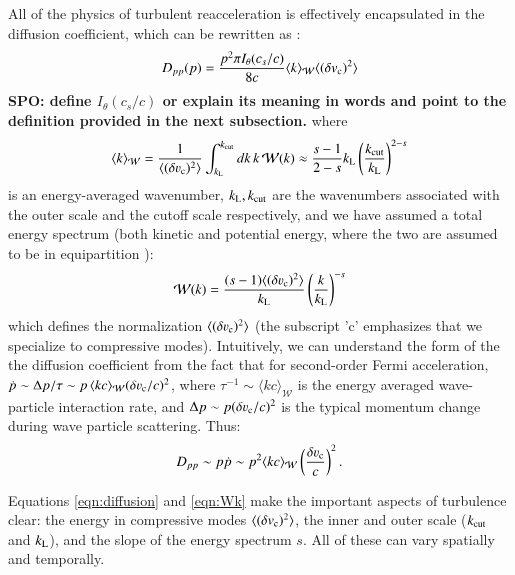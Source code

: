 \documentclass[fleqn,usenatbib,useAMS]{mnras}
\def\SPO#1{{\bf {\color{red} SPO: #1}}}
\begin{document}
All of the physics of turbulent reacceleration is effectively encapsulated in the diffusion coefficient, which can be rewritten as \citep{2015ApJ...800...60M}:
\begin{equation}
D_{pp}(p) = \frac{ p^{2} \pi I_{\theta}(c_{s}/c)}{8 c} \langle k \rangle_{\mathcal{W}} \langle (\delta v_{\rm c})^{2} \rangle
\label{eqn:diffusion}
\end{equation}
\SPO{define $I_{\theta}(c_{s}/c)$ or explain its meaning in words and point to the definition provided in the next subsection.}
where
\begin{equation}
\langle k \rangle_{\mathcal{W}} = \frac{1}{\langle (\delta \varv_{\rm c})^{2} \rangle} \int_{k_{\rm L}}^{k_{\rm cut}} dk \, k \, \mathcal{W}(k) \approx \frac{s-1}{2-s} k_{\rm L} \left( \frac{k_{\rm cut}}{k_{\rm L}} \right)^{2-s} 
\end{equation}
is an energy-averaged wavenumber, $k_{\rm L}, k_{\rm cut}$ are the wavenumbers associated with the outer scale and the cutoff scale respectively, and we have assumed a total energy spectrum (both kinetic and potential energy, where the two are assumed to be in equipartition \citep{sarkar11}): 
\begin{equation}
\mathcal{W}(k) = \frac{(s-1) \langle (\delta \varv_{\rm c})^{2} \rangle}{k_{\rm L}} \left( \frac{k}{k_{\rm L}} \right)^{-s} 
\label{eqn:Wk}
\end{equation}
which defines the normalization $\langle (\delta \varv_{\rm c})^{2} \rangle$ (the subscript 'c' emphasizes that we specialize to compressive modes). Intuitively, we can understand the form of the the diffusion coefficient from the fact that for second-order Fermi acceleration, $\dot{p} \sim \Delta p/\tau \sim p\,\langle k c \rangle_{\mathcal{W}} (\delta \varv_{\rm c}/c)^{2}$, where $\tau^{-1} \sim \langle k c \rangle_{\mathcal{W}}$ is the energy averaged wave-particle interaction rate, and $\Delta p \sim p (\delta \varv_{\rm c}/c)^{2}$ is the typical momentum change during wave particle scattering. Thus: 
\begin{equation}
D_{pp} \sim p \dot{p} \sim p^{2} \langle k c \rangle_{\mathcal{W}} \left( \frac{\delta \varv_{\rm c}}{c} \right)^{2}. 
\end{equation}

Equations \ref{eqn:diffusion} and \ref{eqn:Wk} make the important aspects of turbulence clear: the energy in compressive modes $\langle (\delta v_{\rm c})^{2} \rangle$, the inner and outer scale ($k_{\rm cut}$ and $k_{\rm L}$), and the slope of the energy spectrum $s$. All of these can vary spatially and temporally. 
\end{document}
